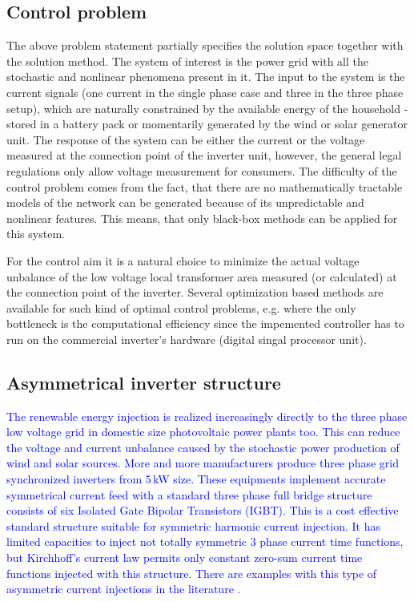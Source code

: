     \subsection{Control problem}

    The above problem statement partially specifies the solution space together with the solution method. The system of interest is the power grid with all the stochastic and nonlinear phenomena present in it. The input to the system is the current signals (one current in the single phase case and three in the three phase setup), which are naturally constrained by the available energy of the household - stored in a battery pack or momentarily generated by the wind or solar generator unit. The response of the system can be either the current or the voltage measured at the connection point of the inverter unit, however, the general legal regulations only allow voltage measurement for consumers. The difficulty of the control problem comes from the fact, that there are no mathematically tractable models of the network can be generated because of its unpredictable and nonlinear features. This means, that only black-box methods can be applied for this system.

    For the control aim it is a natural choice to minimize the actual voltage unbalance of the low voltage local transformer area measured (or calculated) at the connection point of the inverter. Several optimization based methods are available for such kind of optimal control problems, e.g.  \cite{gorbe2012reduction} where the only bottleneck is the computational efficiency since the impemented controller has to run on the commercial inverter's hardware (digital singal processor unit).

    \subsection{Asymmetrical inverter structure}

    \textcolor{blue}{
        The renewable energy injection is realized increasingly directly to the three phase low voltage grid in domestic size photovoltaic power plants too. This can reduce the voltage and current unbalance caused by the stochastic power production of wind and solar sources. More and more manufacturers produce three phase grid synchronized inverters from 5\,kW size. These equipments implement accurate symmetrical current feed with a standard three phase full bridge structure consists of six Isolated Gate Bipolar Transistors (IGBT). This is a cost effective standard structure suitable for symmetric harmonic current injection. It has limited capacities to inject not totally symmetric 3 phase current time functions, but Kirchhoff's current law permits only constant zero-sum current time functions injected with this structure. There are examples with this type of asymmetric current injections in the literature \cite{lee2010new}.}

